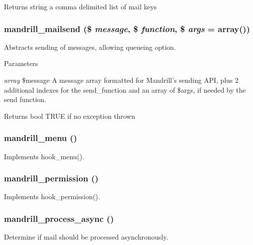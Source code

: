 \begin{DoxyReturn}{Returns}
string a comma delimited list of mail keys 
\end{DoxyReturn}
\hypertarget{mandrill_8module_a3491d792be9e5ad28ca92986f432f23e}{
\subsubsection[{mandrill\_\-mailsend}]{\setlength{\rightskip}{0pt plus 5cm}mandrill\_\-mailsend (\$ {\em message}, \/  \$ {\em function}, \/  \$ {\em args} = {\ttfamily array()})}}
\label{mandrill_8module_a3491d792be9e5ad28ca92986f432f23e}
Abstracts sending of messages, allowing queueing option.


\begin{DoxyParams}{Parameters}
\item[{\em array}]\$message A message array formatted for Mandrill's sending API, plus 2 additional indexes for the send\_\-function and an array of \$args, if needed by the send function.\end{DoxyParams}
\begin{DoxyReturn}{Returns}
bool TRUE if no exception thrown 
\end{DoxyReturn}
\hypertarget{mandrill_8module_ab717377383339b55b058af1f4bb87fef}{
\subsubsection[{mandrill\_\-menu}]{\setlength{\rightskip}{0pt plus 5cm}mandrill\_\-menu ()}}
\label{mandrill_8module_ab717377383339b55b058af1f4bb87fef}
Implements hook\_\-menu(). \hypertarget{mandrill_8module_aef9ed053e9f12225ca85eab6d7f93647}{
\subsubsection[{mandrill\_\-permission}]{\setlength{\rightskip}{0pt plus 5cm}mandrill\_\-permission ()}}
\label{mandrill_8module_aef9ed053e9f12225ca85eab6d7f93647}
Implements hook\_\-permission(). \hypertarget{mandrill_8module_a087c8f74e44d40dcb13cbc3072b1cd93}{
\subsubsection[{mandrill\_\-process\_\-async}]{\setlength{\rightskip}{0pt plus 5cm}mandrill\_\-process\_\-async ()}}
\label{mandrill_8module_a087c8f74e44d40dcb13cbc3072b1cd93}
Determine if mail should be processed asynchronously.

